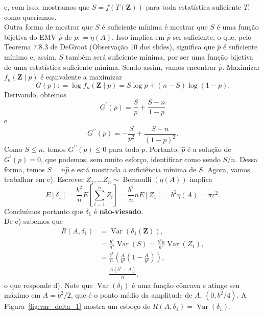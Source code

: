 \documentclass[a4paper,10pt, notitlepage]{report}
\newcommand{\vr}{\operatorname{Var}} %
\begin{document}
{$$$$
e, com isso, mostramos que $S = f(T(\boldsymbol{Z}))$ para toda estatística suficiente $T$, como queríamos.
\\
Outra forma de mostrar que $S$ é suficiente mínima é mostrar que $S$ é uma função bijetiva do EMV $\hat{ p }$ de $p : = \eta ( A )$.
Isso implica em $\hat{ p }$ ser suficiente, o que, pelo Teorema 7.8.3 de DeGroot (Observação 10 dos slides), significa que $\hat{ p }$ é suficiente mínimo e, assim, $S$ também será suficiente mínima, por ser uma função bijetiva de uma estatística suficiente mínima.
Sendo assim, vamos encontrar $\hat{ p }$.
Maximizar $f_{ n } ( \boldsymbol{Z} \mid p )$ é equivalente a maximizar
\begin{equation*}
    G ( p ) : = \log f_{ n } ( \boldsymbol{Z} \mid p ) = S \log p + ( n - S ) \log ( 1 - p ).
\end{equation*}
Derivando, obtemos
\begin{equation*}
    G^\prime ( p ) = \frac{ S }{ p } + \frac{ S - n }{ 1 - p }
\end{equation*}
e
\begin{equation*}
    G^{\prime\prime} ( p ) = - \frac{ S }{ p^2 } + \frac{ S - n }{ ( 1 - p )^2 }.
    \end{equation*}
Como $S \leq n$, temos $G^{\prime\prime}(p) \leq 0$ para todo $p$.
Portanto, $\hat{ p }$ é a solução de $G^\prime(p) = 0$, que podemos, sem muito esforço, identificar como sendo $S/n$.
Dessa forma, temos $S = n \hat{ p }$ e está mostrada a suficiência mínima de $S$.
Agora, vamos trabalhar em c).
Escrever $Z_1, \ldots Z_n \sim \operatorname{Bernoulli}(\eta(A))$ implica
$$
E[\delta_1] = \frac{b^2}{n}E\left[\sum_{i=1}^n Z_i\right] = \frac{b^2}{n} n E[Z_1] = b^2\eta(A) = \pi r^2.
$$
Concluímos portanto que $\delta_1$ é \textbf{não-viesado}.
\\
De c) sabemos que 
\begin{align*}
R(A, \delta_1) &= \vr\left(\delta_1(\boldsymbol{Z})\right),\\
&= \frac{b^4}{n^2}\vr(S) = \frac{b^4n}{n^2}\vr(Z_1),\\
&= \frac{b^4}{n}\left(\frac{A}{b^2}\left(1-\frac{A}{b^2}\right)\right),\\
&= \frac{A(b^2-A)}{n},
\end{align*}
o que responde d).
Note que $\vr(\delta_1)$ é uma função côncava e atinge seu máximo em $A = b^2/2$, que é o ponto médio da amplitude de $A$, $(0, b^2/4)$.
A Figura~\ref{fig:var_delta_1} mostra um esboço de $R(A, \delta_1) = \vr\left(\delta_1\right)$.
\begin{figure}[!ht]

\end{figure}}
\end{document}
